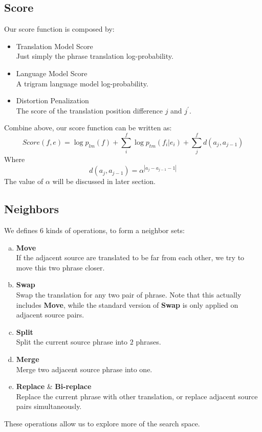 \documentclass[11pt]{article}
\begin{document}
\subsection{Score} %
\label{sub:score}
Our score function is composed by:
\begin{itemize}
	\item Translation Model Score\\
	Just simply the phrase translation log-probability.
	\item Language Model Score\\
	A trigram language model log-probability.
	\item Distortion Penalization\\
	The score of the translation position difference $j$ and $j^{\prime}$.
\end{itemize}
Combine above, our score function\cite{spt} can be written as:
$$ Score(f,e) = \log p_{lm}(f) + \sum_i^f \log p_{tm}(f_i|e_i) + \sum_j^f d(a_j,a_{j-1})$$
Where $$ d(a_j,a_{j-1}) = \alpha^{|a_j - a_{j-1} -1|}$$
The value of $\alpha$ will be discussed in later section.

\subsection{Neighbors} %
\label{sub:neighbors}
We defines $6$ kinds of operations, to form a neighbor sets:
\begin{enumerate}[a.]
	\item \textbf{Move}\\
	If the adjacent source are translated to be far from each other, we try to move this two phrase closer.
	\item \textbf{Swap}\\
	Swap the translation for any two pair of phrase. Note that this actually includes \textbf{Move}, while the standard version of \textbf{Swap} is only applied on adjacent source pairs.
	\item \textbf{Split}\\
	Split the current source phrase into $2$ phrases.
	\item \textbf{Merge}\\
	Merge two adjacent source phrase into one.
	\item \textbf{Replace} \& \textbf{Bi-replace}\\
	Replace the current phrase with other translation, or replace adjacent source pairs simultaneously.
\end{enumerate}
These operations allow us to explore more of the search space.
\end{document}
